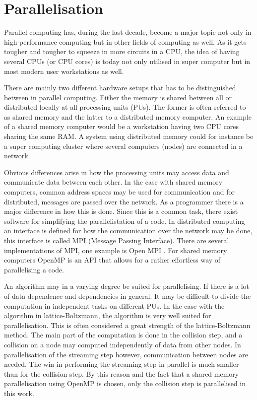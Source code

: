 \section{Parallelisation}

Parallel computing has, during the last decade, become a major topic
not only in high-performance computing but in other fields of
computing as well. As it gets tougher and tougher to squeeze in more
circuits in a CPU, the idea of having several CPUs (or CPU cores) is
today not only utilised in super computer but in most modern user
workstations as well.

There are mainly two different hardware setups that has to be
distinguished between in parallel computing. Either the memory is
shared between all or distributed locally at all processing units
(PUs). The former is often referred to as shared memory and the latter
to a distributed memory computer. An example of a shared memory
computer would be a workstation having two CPU cores sharing the same
RAM. A system using distributed memory could for instance be a super
computing cluster where several computers (nodes) are connected in a
network.

Obvious differences arise in how the processing units may access data
and communicate data between each other.  In the case with shared
memory computers, common address spaces may be used for communication
and for distributed, messages are passed over the network. As a
programmer there is a major difference in how this is done. Since this
is a common task, there exist software for simplifying the
parallelistation of a code. In distributed computing an interface is
defined for how the communication over the network may be done, this
interface is called MPI (Message Passing Interface). There are several
implementations of MPI, one example is Open MPI \cite{openmpi}. For
shared memory computers OpenMP \cite{openmp} is an API that allows for
a rather effortless way of parallelising a code.

An algorithm may in a varying degree be suited for parallelising. If
there is a lot of data dependence and dependencies in general. It may
be difficult to divide the computation in independent tasks on
different PUs. In the case with the algorithm in lattice-Boltzmann,
the algorithm is very well suited for parallelisation. This is often
considered a great strength of the lattice-Boltzmann method. The
main part of the computation is done in the collision step, and a
collision on a node may computed independently of data from other
nodes. In parallelisation of the streaming step however, communication
between nodes are needed. The win in performing the streaming step in
parallel is much smaller than for the collision step. By this reason
and the fact that a shared memory parallelisation using OpenMP is
chosen, only the collision step is parallelised in this work.


